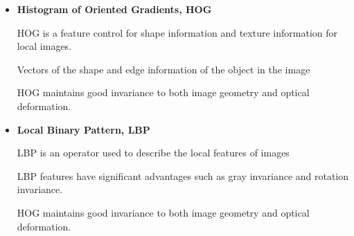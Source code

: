 \documentclass[CJK,aspectratio=169]{beamer}  %
\begin{document}
	\begin{frame}
		
		\begin{itemize} 
			\item \textbf{Histogram of Oriented Gradients, HOG}
			\vspace{.3cm}
			
			\small HOG is a feature control for shape information and texture information for local images.
			
			\small Vectors of the shape and edge information of the object in the image
			
			\small HOG maintains good invariance to both image geometry and optical deformation.
		\end{itemize}
		
		\begin{itemize} 
			\item \textbf{Local Binary Pattern, LBP}
			\vspace{.3cm}
			
			\small LBP is an operator used to describe the local features of images
			
			\small LBP features have significant advantages such as gray invariance and rotation invariance.
			
			\small HOG maintains good invariance to both image geometry and optical deformation.
		\end{itemize}
		

\end{frame}
\end{document}
